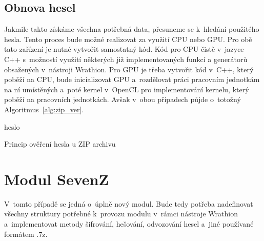 \subsection{Obnova hesel}
Jakmile takto získáme všechna potřebná data, přesuneme se k~hledání použitého hesla. Tento proces
bude možné realizovat za využití CPU nebo GPU. Pro obě tato zařízení je nutné vytvořit samostatný
kód. Kód pro CPU čistě v~jazyce C++ s~možností využití některých již implementovaných funkcí a
generátorů obsažených v~nástroji Wrathion. Pro GPU je třeba vytvořit kód v~C++, který poběží na
CPU, bude inicializovat GPU a~rozdělovat práci pracovním jednotkám na ní umístěných a~poté kernel
v~OpenCL pro implementování kernelu, který poběží na pracovních jednotkách. Avšak v~obou
případech půjde o~totožný Algoritmus~\ref{alg:zip_ver}.

\begin{algorithm}[ht]
    \SetStartEndCondition{ (}{)}{)}\SetAlgoBlockMarkers{}{}%
    \AlgoDisplayBlockMarkers\SetAlgoNoLine%
    \DontPrintSemicolon
    \Return heslo\;
    \caption{Princip ověření hesla u ZIP archivu}\label{alg:zip_ver}
\end{algorithm}

\section{Modul SevenZ}
V~tomto případě se jedná o~úplně nový modul. Bude tedy potřeba nadefinovat všechny struktury
potřebné k~provozu modulu v~rámci nástroje Wrathion a~implementovat metody šifrování, hešování,
odvozování hesel a~jiné používané formátem .7z.

